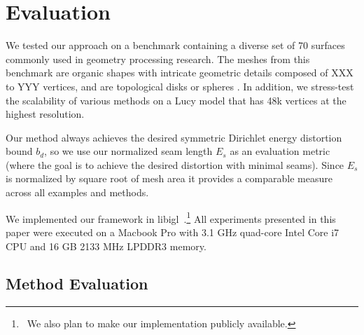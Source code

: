 
\section{Evaluation}
\label{sec:results}

We tested our approach on a benchmark containing a diverse set of 70 surfaces commonly used in geometry processing research.  The meshes from this benchmark  are organic shapes with intricate geometric details composed of XXX to YYY  vertices, and are topological disks or spheres . In addition, we stress-test the scalability of various methods on a Lucy model that has 48k vertices at the highest resolution. 

Our method always achieves the desired symmetric Dirichlet energy distortion bound $b_d$, so we use our normalized seam length $E_{s}$ as an evaluation metric (where the goal is to achieve the desired distortion with minimal seams). Since $E_{s}$ is normalized by square root of mesh area it provides a comparable measure across all examples and methods. 

We implemented our framework in libigl~\cite{libigl}.\footnote{~We also plan to make our implementation publicly available.} All experiments presented in this paper were executed on a Macbook Pro with 3.1 GHz quad-core Intel Core i7 CPU and 16 GB 2133 MHz LPDDR3 memory.



\subsection{Method Evaluation}


